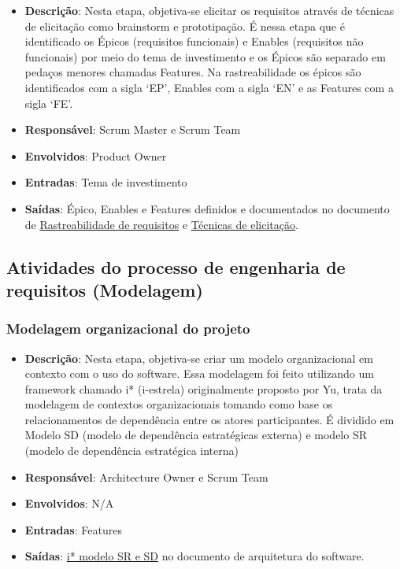 \begin{itemize}
  \item \textbf{Descrição}: Nesta etapa, objetiva-se elicitar os requisitos através de técnicas de elicitação como brainstorm e prototipação. É nessa etapa que é identificado os Épicos (requisitos funcionais) e Enables (requisitos não funcionais) por meio do tema de investimento e os Épicos são separado em pedaços menores chamadas Features. Na rastreabilidade os épicos são identificados com a sigla ‘EP’, Enables com a sigla ‘EN’ e as Features com a sigla ‘FE’.
  \item \textbf{Responsável}: Scrum Master e Scrum Team
  \item \textbf{Envolvidos}: Product Owner
  \item \textbf{Entradas}: Tema de investimento
  \item \textbf{Saídas}: Épico, Enables e Features definidos e documentados no documento de \href{https://github.com/VictorArnaud/TBL/wiki/Rastreabilidade-de-requisitos}{Rastreabilidade de requisitos} e \href{https://github.com/VictorArnaud/TBL/wiki/T%C3%A9cnicas-de-elicita%C3%A7%C3%A3o}{Técnicas de elicitação}.
\end{itemize}

\subsection{Atividades do processo de engenharia de requisitos (Modelagem)}

\subsubsection{Modelagem organizacional do projeto}

\begin{itemize}
  \item \textbf{Descrição}: Nesta etapa, objetiva-se criar um modelo organizacional em contexto com o uso do software.  Essa modelagem foi feito utilizando um framework chamado i* (i-estrela) originalmente proposto por Yu, trata da modelagem de contextos organizacionais tomando como base os relacionamentos de dependência entre os atores participantes. É dividido em Modelo SD (modelo de dependência estratégicas externa) e modelo SR (modelo de dependência estratégica interna)
  \item \textbf{Responsável}: Architecture Owner e Scrum Team
  \item \textbf{Envolvidos}: N/A
  \item \textbf{Entradas}: Features
  \item \textbf{Saídas}: \href{https://victorarnaud.github.io/TBL/contribuicao/arquitetura/#4-framework-i}{i* modelo SR e SD} no documento de arquitetura do software.
\end{itemize}

